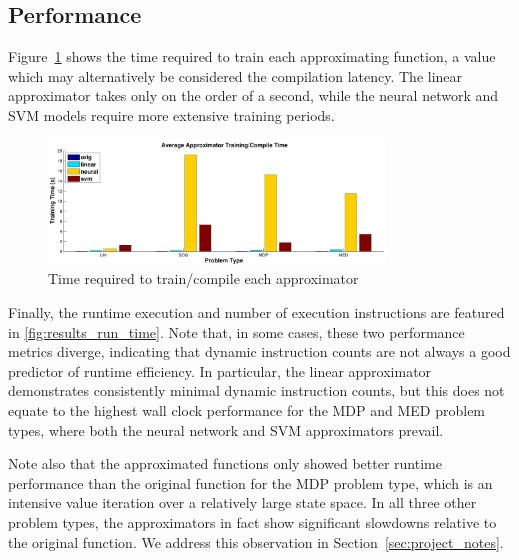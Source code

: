 \documentclass{article}
\begin{document}
\subsection{Performance}

Figure~\ref{fig:results_train_time} shows the time required to train each approximating function, a value which may alternatively be considered the compilation latency. The linear approximator takes only on the order of a second, while the neural network and SVM models require more extensive training periods.

\begin{figure}
  \centering
  \includegraphics[width=0.8\textwidth]{images/results_train_time}
  \caption{Time required to train/compile each approximator}
  \label{fig:results_train_time}
\end{figure}

Finally, the runtime execution and number of execution instructions are featured in \ref{fig:results_run_time}. Note that, in some cases, these two performance metrics diverge, indicating that dynamic instruction counts are not always a good predictor of runtime efficiency. In particular, the linear approximator demonstrates consistently minimal dynamic instruction counts, but this does not equate to the highest wall clock performance for the MDP and MED problem types, where both the neural network and SVM approximators prevail.

Note also that the approximated functions only showed better runtime performance than the original function for the MDP problem type, which is an intensive value iteration over a relatively large state space. In all three other problem types, the approximators in fact show significant slowdowns relative to the original function. We address this observation in Section~\ref{sec:project_notes}.
\end{document}
